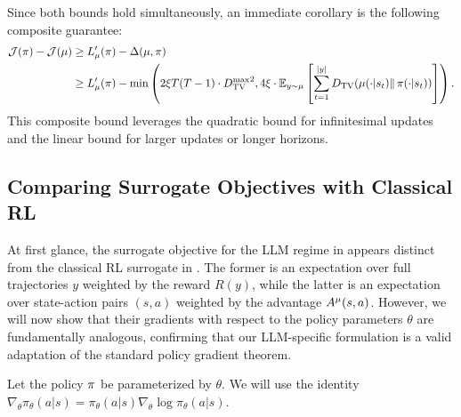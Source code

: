 Since both bounds hold simultaneously, an immediate corollary is the following composite guarantee:
\begin{align*}  
\mathcal{J}(\operatorname*{{\textcolor{black}{\pi}}}) - \mathcal{J}(\operatorname*{{\textcolor{black}{\mu}}}) &\ge L_{\operatorname*{{\textcolor{black}{\mu}}}}'(\operatorname*{{\textcolor{black}{\pi}}}) - \Delta(\operatorname*{{\textcolor{black}{\mu}}}, \operatorname*{{\textcolor{black}{\pi}}}) \\  
&\ge L_{\operatorname*{{\textcolor{black}{\mu}}}}'(\operatorname*{{\textcolor{black}{\pi}}}) - \min \left( 2\xi T(T-1) \cdot {D_{\mathrm{TV}}^{\max}}^2, 4\xi \cdot \mathbb{E}_{y \sim \operatorname*{{\textcolor{black}{\mu}}}} \left[ \sum_{t=1}^{|y|} D_{\mathrm{TV}}(\operatorname*{{\textcolor{black}{\mu}}}(\cdot|s_t) \|  \operatorname*{{\textcolor{black}{\pi}}}(\cdot|s_t)) \right] \right).  
\end{align*}  
This composite bound leverages the quadratic bound for infinitesimal updates and the linear bound for larger updates or longer horizons.

\subsection{Comparing Surrogate Objectives with Classical RL}  
\label{app:compare_classical_rl}  
  
At first glance, the surrogate objective for the LLM regime in  appears distinct from the classical RL surrogate in . The former is an expectation over full trajectories $y$ weighted by the reward $R(y)$, while the latter is an expectation over state-action pairs $(s,a)$ weighted by the advantage $A^{\operatorname*{{\textcolor{black}{\mu}}}}(s,a)$. However, we will now show that their gradients with respect to the policy parameters $\theta$ are fundamentally analogous, confirming that our LLM-specific formulation is a valid adaptation of the standard policy gradient theorem.  
  
Let the policy $\operatorname*{{\textcolor{black}{\pi}}}$ be parameterized by $\theta$. We will use the identity $\nabla_\theta \pi_\theta(a|s) = \pi_\theta(a|s) \nabla_\theta \log \pi_\theta(a|s)$.  
  
